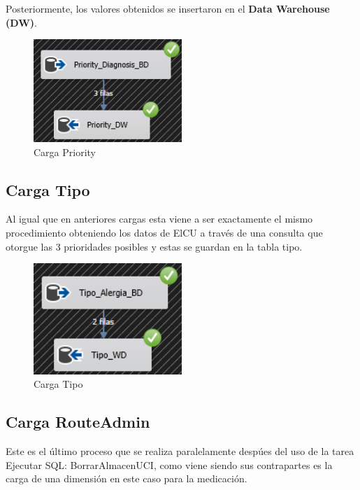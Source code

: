\documentclass[12pt, a4paper, twoside]{article}
\begin{document}
	Posteriormente, los valores obtenidos se insertaron en el \textbf{Data Warehouse (DW)}.
	
	\begin{figure}[H]
		\centering
		\includegraphics[width=0.5\textwidth]{image/111_carga_priority.png}
		\caption{Carga Priority}
		\label{fig:20}
	\end{figure}
	
	\subsection{Carga Tipo}
	
	Al igual que en anteriores cargas esta viene a ser exactamente el mismo procedimiento obteniendo los datos de ElCU a través de una consulta que otorgue las 3 prioridades posibles y estas se guardan en la tabla tipo.
	
	\begin{figure}[H]
		\centering
		\includegraphics[width=0.5\textwidth]{image/114_carga_TIPO.png}
		\caption{Carga Tipo}
		\label{fig:31}
	\end{figure}
	
	\subsection{Carga RouteAdmin}
	
	Este es el último proceso que se realiza paralelamente despúes del uso de la tarea Ejecutar SQL: BorrarAlmacenUCI, como viene siendo sus contrapartes es la carga de una dimensión en este caso para la medicación.
	
\end{document}
